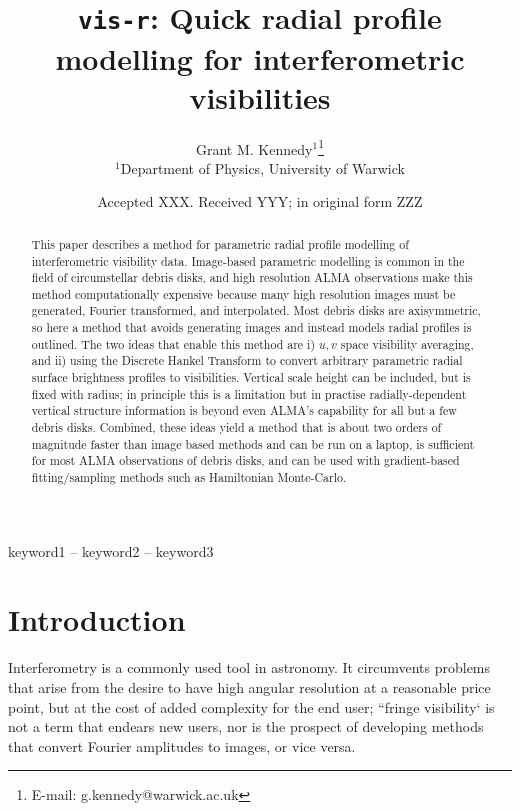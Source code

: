 \documentclass[fleqn,usenatbib]{mnras}
\title[vis-r]{\texttt{vis-r}: Quick radial profile modelling for interferometric visibilities}
\author[G. M. Kennedy]{
Grant M. Kennedy$^{1}$\thanks{E-mail: g.kennedy@warwick.ac.uk}
\\
$^{1}$Department of Physics, University of Warwick
}
\date{Accepted XXX. Received YYY; in original form ZZZ}
\begin{document}
\label{firstpage}
\pagerange{\pageref{firstpage}--\pageref{lastpage}}
\maketitle

\begin{abstract}
This paper describes a method for parametric radial profile modelling of interferometric visibility data. Image-based parametric modelling is common in the field of circumstellar debris disks, and high resolution ALMA observations make this method computationally expensive because many high resolution images must be generated, Fourier transformed, and interpolated. Most debris disks are axisymmetric, so here a method that avoids generating images and instead models radial profiles is outlined. The two ideas that enable this method are i) $u,v$ space visibility averaging, and ii) using the Discrete Hankel Transform to convert arbitrary parametric radial surface brightness profiles to visibilities. Vertical scale height can be included, but is fixed with radius; in principle this is a limitation but in practise radially-dependent vertical structure information is beyond even ALMA's capability for all but a few debris disks. Combined, these ideas yield a method that is about two orders of magnitude faster than image based methods and can be run on a laptop, is sufficient for most ALMA observations of debris disks, and can be used with gradient-based fitting/sampling methods such as Hamiltonian Monte-Carlo.
\end{abstract}

\begin{keywords}
keyword1 -- keyword2 -- keyword3
\end{keywords}



\section{Introduction}

Interferometry is a commonly used tool in astronomy. It circumvents problems that arise from the desire to have high angular resolution at a reasonable price point, but at the cost of added complexity for the end user; ``fringe visibility` is not a term that endears new users, nor is the prospect of developing methods that convert Fourier amplitudes to images, or vice versa.
\end{document}
